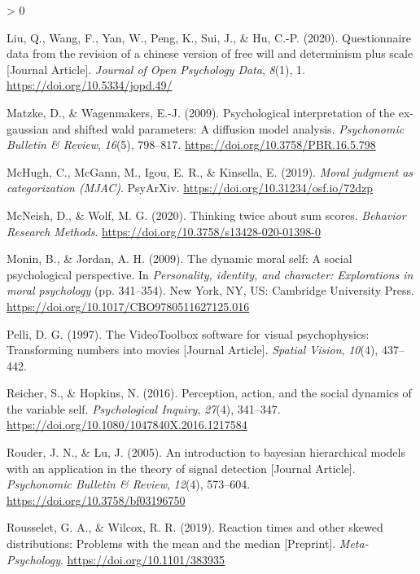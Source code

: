 \documentclass[
  english,
  man]{apa6}
\newlength{\cslhangindent}
\newenvironment{CSLReferences}[2] %
 {%
  \setlength{\parindent}{0pt}
  \ifodd #1 \everypar{\setlength{\hangindent}{\cslhangindent}}\ignorespaces\fi
  \ifnum #2 > 0
  \setlength{\parskip}{#2\baselineskip}
  \fi
 }%
 {}
\begin{document}
\begin{CSLReferences}{1}{0}
\leavevmode\hypertarget{ref-Liu_2020_JOPD}{}%
Liu, Q., Wang, F., Yan, W., Peng, K., Sui, J., \& Hu, C.-P. (2020). Questionnaire data from the revision of a chinese version of free will and determinism plus scale {[}Journal Article{]}. \emph{Journal of Open Psychology Data}, \emph{8}(1), 1. \url{https://doi.org/10.5334/jopd.49/}

\leavevmode\hypertarget{ref-matzke_psychological_2009}{}%
Matzke, D., \& Wagenmakers, E.-J. (2009). Psychological interpretation of the ex-gaussian and shifted wald parameters: A diffusion model analysis. \emph{Psychonomic Bulletin \& Review}, \emph{16}(5), 798--817. \url{https://doi.org/10.3758/PBR.16.5.798}

\leavevmode\hypertarget{ref-mchugh_moral_2019}{}%
McHugh, C., McGann, M., Igou, E. R., \& Kinsella, E. (2019). \emph{Moral judgment as categorization ({MJAC})}. {PsyArXiv}. \url{https://doi.org/10.31234/osf.io/72dzp}

\leavevmode\hypertarget{ref-mcneish_thinking_2020}{}%
McNeish, D., \& Wolf, M. G. (2020). Thinking twice about sum scores. \emph{Behavior Research Methods}. \url{https://doi.org/10.3758/s13428-020-01398-0}

\leavevmode\hypertarget{ref-monin_dynamic_2009}{}%
Monin, B., \& Jordan, A. H. (2009). The dynamic moral self: A social psychological perspective. In \emph{Personality, identity, and character: Explorations in moral psychology} (pp. 341--354). New York, {NY}, {US}: Cambridge University Press. \url{https://doi.org/10.1017/CBO9780511627125.016}

\leavevmode\hypertarget{ref-Pelli_1997}{}%
Pelli, D. G. (1997). The VideoToolbox software for visual psychophysics: Transforming numbers into movies {[}Journal Article{]}. \emph{Spatial Vision}, \emph{10}(4), 437--442.

\leavevmode\hypertarget{ref-reicher_perception_2016}{}%
Reicher, S., \& Hopkins, N. (2016). Perception, action, and the social dynamics of the variable self. \emph{Psychological Inquiry}, \emph{27}(4), 341--347. \url{https://doi.org/10.1080/1047840X.2016.1217584}

\leavevmode\hypertarget{ref-Rouder_2005_BHM_SDT}{}%
Rouder, J. N., \& Lu, J. (2005). An introduction to bayesian hierarchical models with an application in the theory of signal detection {[}Journal Article{]}. \emph{Psychonomic Bulletin \& Review}, \emph{12}(4), 573--604. \url{https://doi.org/10.3758/bf03196750}

\leavevmode\hypertarget{ref-Rousselet_2019}{}%
Rousselet, G. A., \& Wilcox, R. R. (2019). Reaction times and other skewed distributions: Problems with the mean and the median {[}Preprint{]}. \emph{Meta-Psychology}. \url{https://doi.org/10.1101/383935}


\end{CSLReferences}
\end{document}
